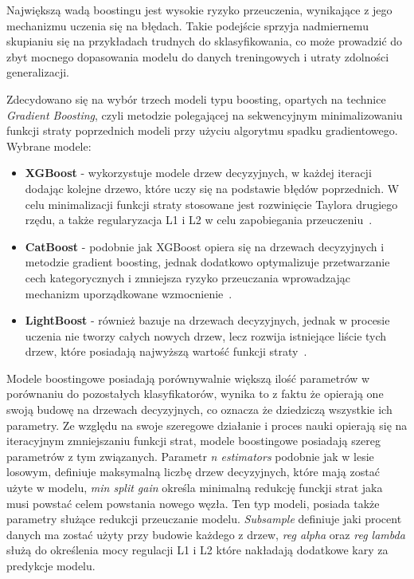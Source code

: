 \documentclass[a4paper,twoside,12pt]{book}
\begin{document}
Największą wadą boostingu jest wysokie ryzyko przeuczenia, wynikające z jego mechanizmu uczenia się na błędach. Takie podejście sprzyja nadmiernemu skupianiu się na przykładach trudnych do sklasyfikowania, co może prowadzić do zbyt mocnego dopasowania modelu do danych treningowych i utraty zdolności generalizacji.

Zdecydowano się na wybór trzech modeli typu boosting, opartych na technice \textit{Gradient Boosting}, czyli metodzie polegającej na sekwencyjnym minimalizowaniu funkcji straty poprzednich modeli przy użyciu algorytmu spadku gradientowego. Wybrane modele:
\begin{itemize}
	\item \textbf{XGBoost} - wykorzystuje modele drzew decyzyjnych, w każdej iteracji dodając kolejne drzewo, które uczy się na podstawie błędów poprzednich. W celu minimalizacji funkcji straty stosowane jest rozwinięcie Taylora drugiego rzędu, a także regularyzacja L1 i L2 w celu zapobiegania przeuczeniu~\cite{Harrison2023}.

	\item \textbf{CatBoost} - podobnie jak XGBoost opiera się na drzewach decyzyjnych i metodzie gradient boosting, jednak dodatkowo optymalizuje przetwarzanie cech kategorycznych i zmniejsza ryzyko przeuczania wprowadzając mechanizm uporządkowane wzmocnienie~\cite{CatBoostDocs2025}.

	\item \textbf{LightBoost} - również bazuje na drzewach decyzyjnych, jednak w procesie uczenia nie tworzy całych nowych drzew, lecz rozwija istniejące liście tych drzew, które posiadają najwyższą wartość funkcji straty~\cite{LightGBMdocs2025}.
\end{itemize}

Modele boostingowe posiadają porównywalnie większą ilość parametrów w porównaniu do pozostałych klasyfikatorów, wynika to z faktu że opierają one swoją budowę na drzewach decyzyjnych, co oznacza że dziedziczą wszystkie ich parametry. Ze względu na swoje szeregowe działanie i proces nauki opierają się na iteracyjnym zmniejszaniu funkcji strat, modele boostingowe posiadają szereg parametrów z tym związanych. Parametr \textit{n estimators} podobnie jak w lesie losowym, definiuje maksymalną liczbę drzew decyzyjnych, które mają zostać użyte w modelu, \textit{min split gain} określa minimalną redukcję funckji strat jaka musi powstać celem powstania nowego węzła. Ten typ modeli, posiada także parametry służące redukcji przeuczanie modelu. \textit{Subsample} definiuje jaki procent danych ma zostać użyty przy budowie każdego z drzew, \textit{reg alpha} oraz \textit{reg lambda} służą do określenia mocy regulacji L1 i L2 które nakładają dodatkowe kary za predykcje modelu.
\end{document}
